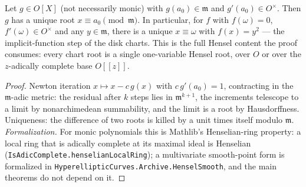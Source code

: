 \begin{theorem}
\label{thm:hensel}
\leanok
Let $g \in O[X]$ (not necessarily monic) with $g(a_0) \in \mathfrak m$ and
$g'(a_0) \in O^\times$. Then $g$ has a unique root $x \equiv a_0 \pmod{\mathfrak m}$. In
particular, for $f$ with $f(\omega) = 0$, $f'(\omega) \in O^\times$ and any
$y \in \mathfrak m$, there is a unique $x \equiv \omega$ with $f(x) = y^2$ --- the
implicit-function step of the disk charts. This is the full Hensel content the proof
consumes: every chart root is a single one-variable Hensel root, over $O$ or over the
$z$-adically complete base $O[[z]]$.
\end{theorem}
\begin{proof}
\leanok
Newton iteration $x \mapsto x - c\, g(x)$ with $c\,g'(a_0) = 1$, contracting in the
$\mathfrak m$-adic metric: the residual after $k$ steps lies in $\mathfrak m^{k+1}$, the
increments telescope to a limit by nonarchimedean summability, and the limit is a root
by Hausdorffness. Uniqueness: the difference of two roots is killed by a unit times
itself modulo $\mathfrak m$. \emph{Formalization.} For monic polynomials this is
Mathlib's Henselian-ring property: a local ring that is adically complete at its maximal
ideal is Henselian (\texttt{IsAdicComplete.henselianLocalRing}); a multivariate smooth-point
form is formalized in \texttt{HyperellipticCurves.Archive.HenselSmooth}, and the main theorems
do not depend on it.
\end{proof}

